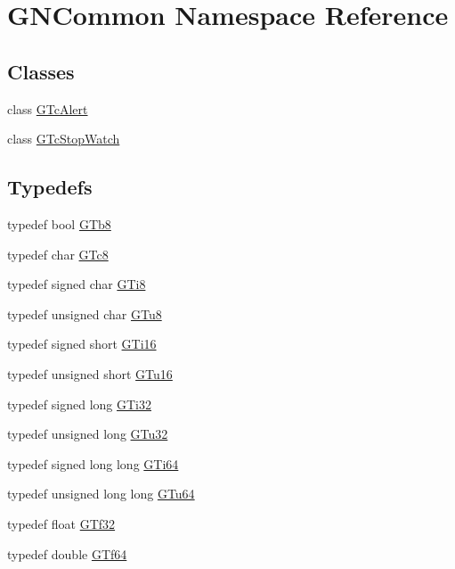 \hypertarget{namespace_g_n_common}{}\section{G\+N\+Common Namespace Reference}
\label{namespace_g_n_common}
\subsection*{Classes}
\begin{DoxyCompactItemize}
\item 
class \mbox{\hyperlink{class_g_n_common_1_1_g_tc_alert}{G\+Tc\+Alert}}
\item 
class \mbox{\hyperlink{class_g_n_common_1_1_g_tc_stop_watch}{G\+Tc\+Stop\+Watch}}
\end{DoxyCompactItemize}
\subsection*{Typedefs}
\begin{DoxyCompactItemize}
\item 
typedef bool \mbox{\hyperlink{namespace_g_n_common_a6b5283329f609e2175dd0c91fc1520ba}{G\+Tb8}}
\item 
typedef char \mbox{\hyperlink{namespace_g_n_common_a60a636fae316405f6926d7c1cf5fb97b}{G\+Tc8}}
\item 
typedef signed char \mbox{\hyperlink{namespace_g_n_common_ae28c69bd0651262bb808483447a43563}{G\+Ti8}}
\item 
typedef unsigned char \mbox{\hyperlink{namespace_g_n_common_a551fbbb7c62c00956ef69d960ca9ccc3}{G\+Tu8}}
\item 
typedef signed short \mbox{\hyperlink{namespace_g_n_common_a965aa02d673a0945678428639d7a3376}{G\+Ti16}}
\item 
typedef unsigned short \mbox{\hyperlink{namespace_g_n_common_a505de69afe5b556e7537ee63e9172c40}{G\+Tu16}}
\item 
typedef signed long \mbox{\hyperlink{namespace_g_n_common_a260b179001602cd6e8226d384ec8581c}{G\+Ti32}}
\item 
typedef unsigned long \mbox{\hyperlink{namespace_g_n_common_ae5485474bc8f23e462e920a17b377b53}{G\+Tu32}}
\item 
typedef signed long long \mbox{\hyperlink{namespace_g_n_common_aa8cf8a182d3e48f629056ff975f607ed}{G\+Ti64}}
\item 
typedef unsigned long long \mbox{\hyperlink{namespace_g_n_common_a01e8527dabf7ab4f123156b0701945eb}{G\+Tu64}}
\item 
typedef float \mbox{\hyperlink{namespace_g_n_common_a95fc9a7f3918597669a4d0bd371d2e9b}{G\+Tf32}}
\item 
typedef double \mbox{\hyperlink{namespace_g_n_common_a22b37ff753b3e7a48d9d31addf35a739}{G\+Tf64}}
\end{DoxyCompactItemize}


